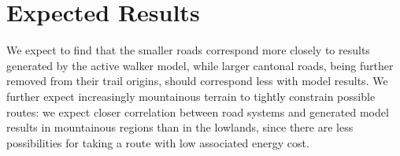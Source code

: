 \documentclass[a4paper, DIV11, abstracton]{scrartcl}
\begin{document}
\section{Expected Results}


We expect to find that the smaller roads correspond more closely to results generated by the active walker model, while larger cantonal roads, being further removed from their trail origins, should correspond less with model results. We further expect increasingly mountainous terrain to tightly constrain possible routes: we expect closer correlation between road systems and generated model results in mountainous regions than in the lowlands, since there are less possibilities for taking a route with low associated energy cost.





\end{document}
